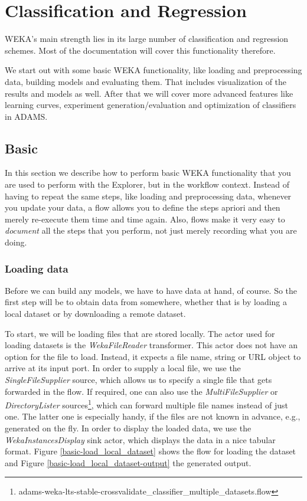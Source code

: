 
\chapter{Classification and Regression}
\label{classification_and_regression}
WEKA's main strength lies in its large number of classification and regression
schemes. Most of the documentation will cover this functionality therefore.

We start out with some basic WEKA functionality, like loading and
preprocessing data, building models and evaluating them. That includes
visualization of the results and models as well. After that we will cover more
advanced features like learning
curves, experiment generation/evaluation and optimization of classifiers in ADAMS.

\newpage
\section{Basic}
In this section we describe how to perform basic WEKA functionality that you are
used to perform with the Explorer, but in the workflow context. Instead of
having to repeat the same steps, like loading and preprocessing data, whenever
you update your data, a flow allows you to define the steps apriori and then merely
re-execute them time and time again. Also, flows make it very easy to
\textit{document} all the steps that you perform, not just merely recording what
you are doing.

\subsection{Loading data}
Before we can build any models, we have to have data at hand, of course. So the
first step will be to obtain data from somewhere, whether that is by loading a
local dataset or by downloading a remote dataset.

To start, we will be loading files that are stored locally. The actor used for
loading datasets is the \textit{WekaFileReader} transformer. This actor does not
have an option for the file to load. Instead, it expects a file name, string or
URL object to arrive at its input port. In order to supply a local file, we use
the \textit{SingleFileSupplier} source, which allows us to specify a single file
that gets forwarded in the flow. If required, one can also use the
\textit{MultiFileSupplier} or \textit{DirectoryLister}
sources\footnote{adams-weka-lts-stable-crossvalidate\_classifier\_multiple\_datasets.flow},
which can forward multiple file names instead of just one. The latter one is
especially handy, if the files are not known in advance, e.g., generated on the
fly. In order to display the loaded data, we use the
\textit{WekaInstancesDisplay} sink actor, which displays the data in a nice
tabular format. Figure \ref{basic-load_local_dataset} shows the flow for loading
the dataset and Figure \ref{basic-load_local_dataset-output} the generated
output.

